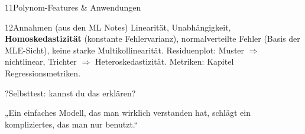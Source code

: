\begin{hngrid}
\begin{hnp}[raster multicolumn=3,acc=hnteal]{11}{Polynom-Features \& Anwendungen}
\end{hnp}
%
\begin{hnp}[raster multicolumn=3,acc=hnteal]{12}{Annahmen (aus den ML Notes)}
Linearität, Unabhängigkeit, \textbf{Homoskedastizität} (konstante Fehlervarianz), normalverteilte Fehler (Basis der MLE-Sicht), keine starke Multikollinearität. Residuenplot: Muster $\Rightarrow$ nichtlinear, Trichter $\Rightarrow$ Heteroskedastizität. Metriken: Kapitel Regressionsmetriken.
\end{hnp}
%
\begin{hnp}[raster multicolumn=6,acc=hnpurple,colback=hnlilac!30]{?}{Selbsttest: kannst du das erklären?}
\end{hnp}
%
\begin{hnbanner}[raster multicolumn=6]
„Ein einfaches Modell, das man wirklich verstanden hat, schlägt ein kompliziertes, das man nur benutzt.“
\end{hnbanner}
\end{hngrid}
